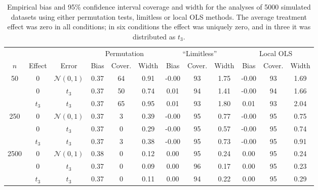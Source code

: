 
\begin{table}
\footnotesize
\begin{tabular}{ccc|ccc|ccc|ccc}
\hline

&&& \multicolumn{ 3 }{c}{Permutation}&\multicolumn{ 3 }{c}{``Limitless''}&\multicolumn{ 3 }{c}{Local OLS}\\
$n$& Effect& Error & Bias&Cover.&Width&Bias&Cover.&Width&Bias&Cover.&Width \\
\hline 
\hline 
\multirow{3}{*}{ 50 } &0& $\mathcal{N}(0,1)$ &0.37&64&0.91&-0.00&93&1.75&-0.00&93&1.69 \\ 
 &  0 & $t_3$ &0.37&50&0.74&0.01&94&1.41&-0.00&94&1.66 \\ 
 &  $t_3$ & $t_3$ &0.37&65&0.95&0.01&93&1.80&0.01&93&2.04 \\ 
\hline 
\multirow{3}{*}{ 250 } &0& $\mathcal{N}(0,1)$ &0.37&3&0.39&-0.00&95&0.77&-0.00&95&0.75 \\ 
 &  0 & $t_3$ &0.37&0&0.29&-0.00&95&0.57&-0.00&95&0.74 \\ 
 &  $t_3$ & $t_3$ &0.37&3&0.38&-0.00&95&0.73&-0.00&95&0.91 \\ 
\hline 
\multirow{3}{*}{ 2500 } &0& $\mathcal{N}(0,1)$ &0.38&0&0.12&0.00&95&0.24&0.00&95&0.24 \\ 
 &  0 & $t_3$ &0.37&0&0.09&0.00&96&0.17&0.00&95&0.23 \\ 
 &  $t_3$ & $t_3$ &0.37&0&0.11&0.00&94&0.22&0.00&95&0.29 \\ 
\hline
\end{tabular}
  \caption{Empirical bias and 95\% confidence interval coverage and width for the analyses of  5000 simulated datasets using either permutation tests, limitless or local OLS methods. The average treatment effect was zero in all conditions; in six conditions the effect was uniquely zero, and in three it was distributed as $t_3$.}
  \label{tab:level}
\end{table}
